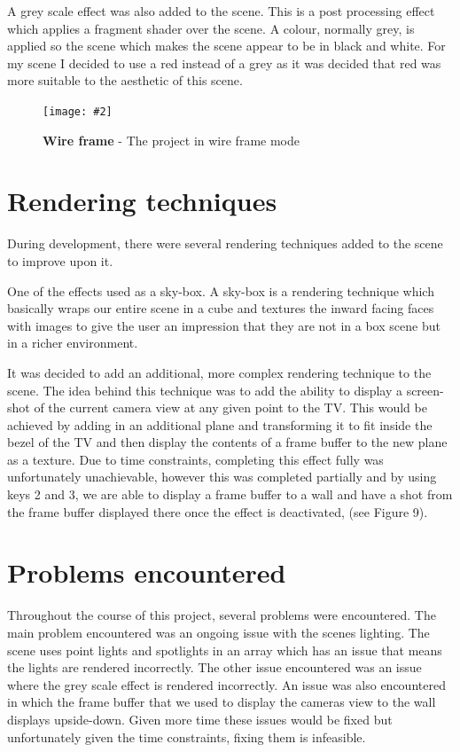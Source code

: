 \documentclass[10pt, a4paper]{article}
\newcommand{\figuremacro}[5]{
    \begin{figure}[#1]
        \centering
        \texttt{[image: \#2]}
        \caption[#3]{\textbf{#3}#4}
        \label{fig:#2}
    \end{figure}
}
\begin{document}
A grey scale effect was also added to the scene. This is a post processing effect which applies a fragment shader over the scene. A colour, normally grey, is applied so the scene which makes the scene appear to be in black and white. For my scene I decided to use a red instead of a grey as it was decided that red was more suitable to the aesthetic of this scene.  

\figuremacro{h}{grayscale.png}{Wire frame}{ - The project in wire frame mode}{1.0}


\section{Rendering techniques}
During development, there were several rendering techniques added to the scene to improve upon it. 

One of the effects used as a sky-box. A sky-box is a rendering technique which basically wraps our entire scene in a cube and textures the inward facing faces with images to give the user an impression that they are not in a box scene but in a richer environment.

It was decided to add an additional, more complex rendering technique to the scene. The idea behind this technique was to add the ability to display a screen-shot of the current camera view at any given point to the TV. This would be achieved by adding in an additional plane and transforming it to fit inside the bezel of the TV and then display the contents of a frame buffer to the new plane as a texture. Due to time constraints, completing this effect fully was unfortunately unachievable, however this was completed partially and by using keys 2 and 3, we are able to display a frame buffer to a wall and have a shot from the frame buffer displayed there once the effect is deactivated, (see Figure 9). 
	\section{Problems encountered}
	
Throughout the course of this project, several problems were encountered. The main problem encountered was an ongoing issue with the scenes lighting. The scene uses point lights and spotlights in an array which has an issue that means the lights are rendered incorrectly. The other issue encountered was an issue where the grey scale effect is rendered incorrectly. An issue was also encountered in which the frame buffer that we used to display the cameras view to the wall displays upside-down. Given more time these issues would be fixed but unfortunately given the time constraints, fixing them is infeasible. 
	
\end{document}
